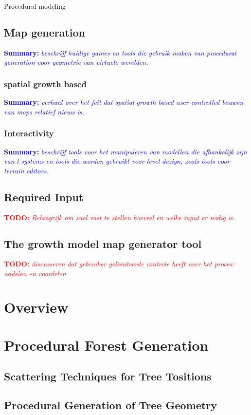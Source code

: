 \documentclass{article}
\newcommand{\todo}[1]{\textcolor{red}{\textbf{\newline TODO: }\it{#1} \newline}}
\newcommand{\inhoud}[1]{\textcolor{blue}{\textbf{\newline Summary: }\it{#1}}}
\begin{document}
Procedural modeling                        


\subsection{Map generation}
\inhoud{beschrijf huidige games en tools die gebruik maken van procedural generation voor geometrie van virtuele werelden.}

\subsubsection{spatial growth based}
\inhoud{verhaal over het feit dat spatial growth based-user controlled bouwen van maps relatief nieuw is.}

\subsubsection{Interactivity}
\inhoud{beschrijf tools voor het manipuleren van modellen die afhankelijk zijn van l-systems en tools die worden 
	gebruikt voor level design, zoals tools voor terrain editors.}


\subsection{Required Input}
\todo{Belangrijk om snel vast te stellen hoeveel en welke input er nodig is.}


\subsection{The growth model map generator tool}
\todo{discusseren dat gebruiker gelimiteerde controle heeft over het proces: nadelen en voordelen}
   
\section{Overview}

\section{Procedural Forest Generation}
\subsection{Scattering Techniques for Tree Tositions}
\subsection{Procedural Generation of Tree Geometry}
\end{document}
